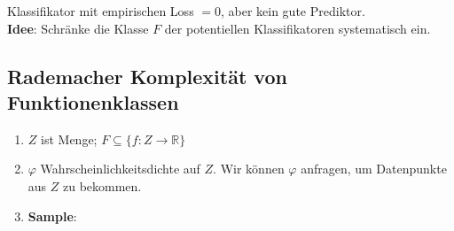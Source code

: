 \begin{enumerate}[1.]

Klassifikator mit empirischen Loss $ = 0$, aber kein gute Prediktor.\\
\textbf{Idee}: Schränke die Klasse $F$ der potentiellen Klassifikatoren systematisch ein.

\subsection*{Rademacher Komplexität von Funktionenklassen}
\begin{enumerate}[1.]
\item $Z$ ist Menge; $F \subseteq \{f: Z \rightarrow \mathbb{R}\}$
\item $\varphi$ Wahrscheinlichkeitsdichte auf $Z$. Wir können $\varphi$ anfragen, um Datenpunkte aus $Z$ zu bekommen.
\item \textbf{Sample}: 
\end{enumerate} 
\end{enumerate}